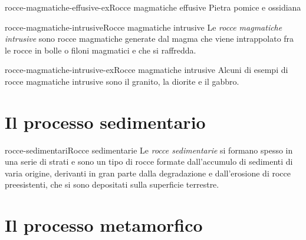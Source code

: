 \documentclass[preview]{standalone}
\begin{document}
\begin{snippetexample}{rocce-magmatiche-effusive-ex}{Rocce magmatiche effusive}
    Pietra pomice e ossidiana
\end{snippetexample}

\begin{snippetdefinition}{rocce-magmatiche-intrusive}{Rocce magmatiche intrusive}
    Le \textit{rocce magmatiche intrusive} sono rocce magmatiche generate
    dal magma che viene intrappolato fra le rocce in bolle o filoni magmatici
    e che si raffredda.
\end{snippetdefinition}


\begin{snippetexample}{rocce-magmatiche-intrusive-ex}{Rocce magmatiche intrusive}
    Alcuni di esempi di rocce magmatiche intrusive sono il granito, la diorite
    e il gabbro.
\end{snippetexample}

\section{Il processo sedimentario}


\begin{snippetdefinition}{rocce-sedimentari}{Rocce sedimentarie}
    Le \textit{rocce sedimentarie} si formano spesso in una serie
    di strati e sono un tipo di rocce formate dall'accumulo
    di sedimenti di varia origine,
    derivanti in gran parte dalla degradazione e dall'erosione di rocce preesistenti,
    che si sono depositati sulla superficie terrestre. 
\end{snippetdefinition}

\section{Il processo metamorfico}
\end{document}

